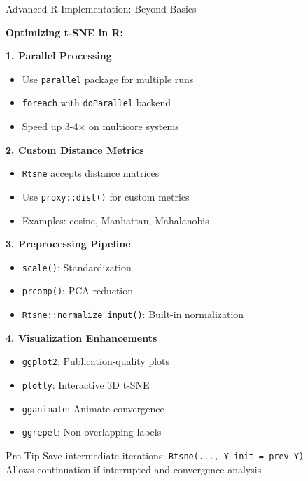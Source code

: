 \documentclass[10pt]{beamer}
\begin{document}
\begin{frame}{Advanced R Implementation: Beyond Basics}

\textbf{Optimizing t-SNE in R:}

\vspace{0.2cm}
\textbf{1. Parallel Processing}
\begin{itemize}
    \setlength\itemsep{0em}
    \item Use \texttt{parallel} package for multiple runs
    \item \texttt{foreach} with \texttt{doParallel} backend
    \item Speed up 3-4× on multicore systems
\end{itemize}

\vspace{0.15cm}
\textbf{2. Custom Distance Metrics}
\begin{itemize}
    \setlength\itemsep{0em}
    \item \texttt{Rtsne} accepts distance matrices
    \item Use \texttt{proxy::dist()} for custom metrics
    \item Examples: cosine, Manhattan, Mahalanobis
\end{itemize}

\vspace{0.15cm}
\textbf{3. Preprocessing Pipeline}
\begin{itemize}
    \setlength\itemsep{0em}
    \item \texttt{scale()}: Standardization
    \item \texttt{prcomp()}: PCA reduction
    \item \texttt{Rtsne::normalize\_input()}: Built-in normalization
\end{itemize}

\vspace{0.15cm}
\textbf{4. Visualization Enhancements}
\begin{itemize}
    \setlength\itemsep{0em}
    \item \texttt{ggplot2}: Publication-quality plots
    \item \texttt{plotly}: Interactive 3D t-SNE
    \item \texttt{gganimate}: Animate convergence
    \item \texttt{ggrepel}: Non-overlapping labels
\end{itemize}

\vspace{0.1cm}
\begin{exampleblock}{Pro Tip}
\footnotesize
Save intermediate iterations: \texttt{Rtsne(..., Y\_init = prev\_Y)}\\
Allows continuation if interrupted and convergence analysis
\end{exampleblock}

\end{frame}
\end{document}
